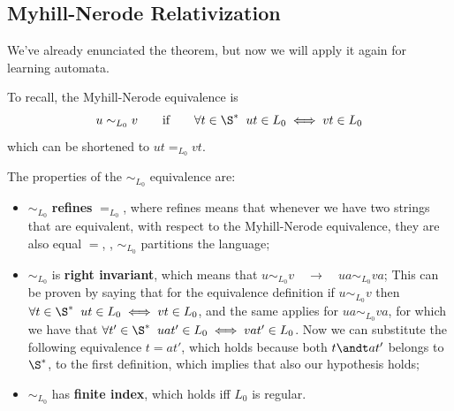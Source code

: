 \documentclass[oneside]{academica}
\begin{document}
\subsection{Myhill-Nerode Relativization}

We've already enunciated the  theorem, but now we will apply it again for learning automata.

To recall, the Myhill-Nerode equivalence is
\begin{equation*}
  u \sim_{L_0} v \qquad \text{if} \qquad \forall t \in \S^* \;\; ut \in L_0 \iff vt \in L_0
\end{equation*}
which can be shortened to $ut =_{L_0} vt$.

The properties of the $\sim_{L_0}$ equivalence are:
\begin{itemize}
  \item $\sim_{L_0}$ \textbf{refines} $=_{L_0}$, where refines means that whenever we have two strings that are equivalent, with respect to the Myhill-Nerode equivalence, they are also equal $=$, \ie, $\sim_{L_0}$ partitions the language;
  \item $\sim_{L_0}$ is \textbf{right invariant}, which means that  $u \sim_{L_0} v \quad \to \quad ua \sim_{L_0} va$;
    This can be proven by saying that for the equivalence definition if $u \sim_{L_0} v$ then $\forall t \in \S^* \;\; ut \in L_0 \iff vt \in L_0$, and the same applies for $ua \sim_{L_0} va$, for which we have that $\forall t' \in \S^* \;\; uat' \in L_0 \iff vat' \in L_0$.
    Now we can substitute the following equivalence $t = at'$, which holds because both $t \andt at'$ belongs to $\S^*$, to the first definition, which implies that also our hypothesis holds;
  \item $\sim_{L_0}$ has \textbf{finite index}, which holds iff $L_0$ is regular.
\end{itemize}
\end{document}
